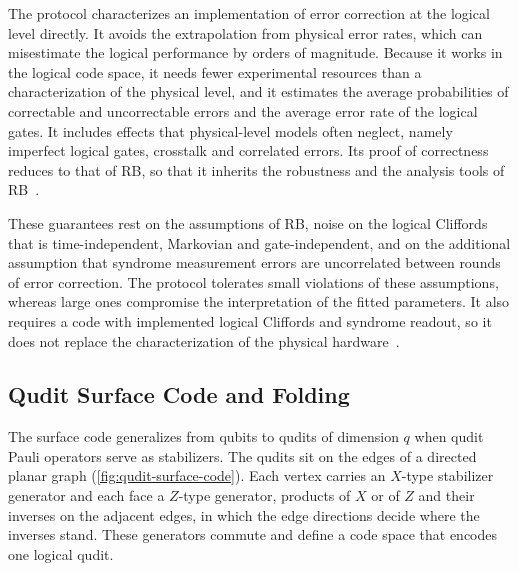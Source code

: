 The protocol characterizes an implementation of error correction at the logical level directly. It avoids the extrapolation from physical error rates, which can misestimate the logical performance by orders of magnitude. Because it works in the logical code space, it needs fewer experimental resources than a characterization of the physical level, and it estimates the average probabilities of correctable and uncorrectable errors and the average error rate of the logical gates. It includes effects that physical-level models often neglect, namely imperfect logical gates, crosstalk and correlated errors. Its proof of correctness reduces to that of RB, so that it inherits the robustness and the analysis tools of RB~\cite{Combes2017}.

These guarantees rest on the assumptions of RB, noise on the logical Cliffords that is time-independent, Markovian and gate-independent, and on the additional assumption that syndrome measurement errors are uncorrelated between rounds of error correction. The protocol tolerates small violations of these assumptions, whereas large ones compromise the interpretation of the fitted parameters. It also requires a code with implemented logical Cliffords and syndrome readout, so it does not replace the characterization of the physical hardware~\cite{Combes2017}.

\subsection{Qudit Surface Code and Folding}
\label{sec: qudit surface code}\label{app:background-folded}

The surface code generalizes from qubits to qudits of dimension $q$ when qudit Pauli operators serve as stabilizers. The qudits sit on the edges of a directed planar graph (\autoref{fig:qudit-surface-code}). Each vertex carries an $X$-type stabilizer generator and each face a $Z$-type generator, products of $X$ or of $Z$ and their inverses on the adjacent edges, in which the edge directions decide where the inverses stand. These generators commute and define a code space that encodes one logical qudit.


